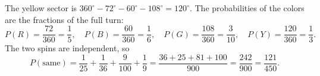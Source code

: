 The yellow sector is $360^\circ-72^\circ-60^\circ-108^\circ=120^\circ$. The probabilities of the colors are the fractions of the full turn:
\[
P(R)=\dfrac{72}{360}=\dfrac{1}{5},\quad P(B)=\dfrac{60}{360}=\dfrac{1}{6},\quad P(G)=\dfrac{108}{360}=\dfrac{3}{10},\quad P(Y)=\dfrac{120}{360}=\dfrac{1}{3} .
\]
The two spins are independent, so
\[
P(\text{same})=\dfrac{1}{25}+\dfrac{1}{36}+\dfrac{9}{100}+\dfrac{1}{9}=\dfrac{36+25+81+100}{900}=\dfrac{242}{900}=\boxed{\dfrac{121}{450}}.
\]
